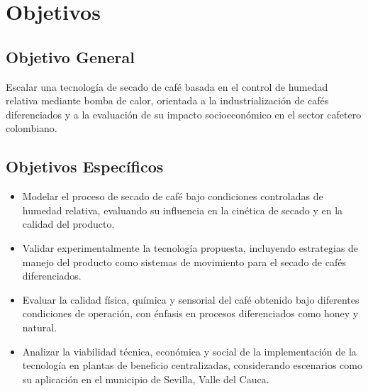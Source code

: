 \section{Objetivos}

\subsection{Objetivo General}

Escalar una tecnología de secado de café basada en el control de humedad relativa mediante bomba de calor, orientada a la industrialización de cafés diferenciados y a la evaluación de su impacto socioeconómico en el sector cafetero colombiano.

\subsection{Objetivos Específicos}

\begin{itemize}

\item Modelar el proceso de secado de café bajo condiciones controladas de humedad relativa, evaluando su influencia en la cinética de secado y en la calidad del producto.

\item Validar experimentalmente la tecnología propuesta, incluyendo estrategias de manejo del producto como sistemas de movimiento para el secado de cafés diferenciados.

\item Evaluar la calidad física, química y sensorial del café obtenido bajo diferentes condiciones de operación, con énfasis en procesos diferenciados como honey y natural.

\item Analizar la viabilidad técnica, económica y social de la implementación de la tecnología en plantas de beneficio centralizadas, considerando escenarios como su aplicación en el municipio de Sevilla, Valle del Cauca.

\end{itemize}